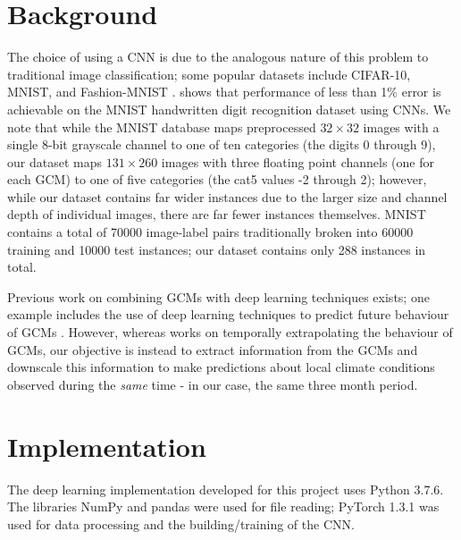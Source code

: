 \documentclass[11pt,a4paper, titlepage]{article}
\begin{document}
\section{Background}
The choice of using a CNN is due to the analogous nature of this problem to traditional image classification; some popular datasets include CIFAR-10, MNIST, and Fashion-MNIST \cite{xiao2017fashion}. \cite{simard2003best} shows that performance of less than 1\% error is achievable on the MNIST handwritten digit recognition dataset using CNNs. We note that while the MNIST database maps preprocessed $32 \times 32$ images with a single 8-bit grayscale channel to one of ten categories (the digits 0 through 9), our dataset maps $131 \times 260$ images with three floating point channels (one for each GCM) to one of five categories (the cat5 values -2 through 2); however, while our dataset contains far wider instances due to the larger size and channel depth of individual images, there are far fewer instances themselves. MNIST contains a total of 70000 image-label pairs traditionally broken into 60000 training and 10000 test instances; our dataset contains only 288 instances in total.

\smallskip

Previous work on combining GCMs with deep learning techniques exists; one example includes the use of deep learning techniques to predict future behaviour of GCMs \cite{scher2018toward}. However, whereas \cite{scher2018toward} works on temporally extrapolating the behaviour of GCMs, our objective is instead to extract information from the GCMs and downscale this information to make predictions about local climate conditions observed during the \emph{same} time - in our case, the same three month period.

\section{Implementation}
The deep learning implementation developed for this project uses Python 3.7.6. The libraries NumPy and pandas were used for file reading; PyTorch 1.3.1 \cite{paszke2019pytorch} was used for data processing and the building/training of the CNN.
\end{document}
